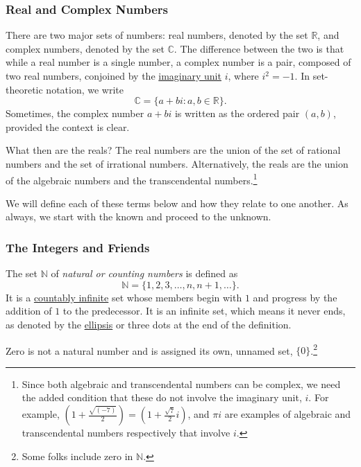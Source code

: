 \documentclass[
  a4paper,
]{article}
\begin{document}
\subsubsection{Real and Complex Numbers}\label{real-and-complex-numbers}

There are two major sets of numbers: real numbers, denoted by the set
\(\mathbb{R}\), and complex numbers, denoted by the set \(\mathbb{C}\).
The difference between the two is that while a real number is a single
number, a complex number is a pair, composed of two real numbers,
conjoined by the
\href{https://en.wikipedia.org/wiki/Imaginary_unit}{imaginary unit}
\(i\), where \(i^2 = -1\). In set-theoretic notation, we write \[
\mathbb{C} = \{a + bi: a, b \in \mathbb{R}\}.
\] Sometimes, the complex number \(a + bi\) is written as the ordered
pair \((a, b)\), provided the context is clear.

What then are the reals? The real numbers are the union of the set of
rational numbers and the set of irrational numbers. Alternatively, the
reals are the union of the algebraic numbers and the transcendental
numbers.\footnote{Since both algebraic and transcendental numbers can be
  complex, we need the added condition that these do not involve the
  imaginary unit, \(i\). For example,
  \((1 + \frac{\sqrt{(-7)}}{2}) = (1 + \frac{\sqrt{7}}{2}i)\), and
  \(\pi i\) are examples of algebraic and transcendental numbers
  respectively that involve \(i\).}

We will define each of these terms below and how they relate to one
another. As always, we start with the known and proceed to the unknown.

\subsubsection{The Integers and Friends}\label{the-integers-and-friends}

The set \(\mathbb{N}\) of \emph{natural or counting numbers} is defined
as \[
\mathbb{N} = \{1, 2, 3, \dots, n, n+1, \dots\}.
\] It is a \href{https://en.wikipedia.org/wiki/Countable_set}{countably
infinite} set whose members begin with \(1\) and progress by the
addition of \(1\) to the predecessor. It is an infinite set, which means
it never ends, as denoted by the
\href{https://www.grammarly.com/blog/ellipsis/}{ellipsis} or three dots
at the end of the definition.

Zero is not a natural number and is assigned its own, unnamed set,
\(\{0\}\).\footnote{Some folks include zero in \(\mathbb{N}\).}
\end{document}
